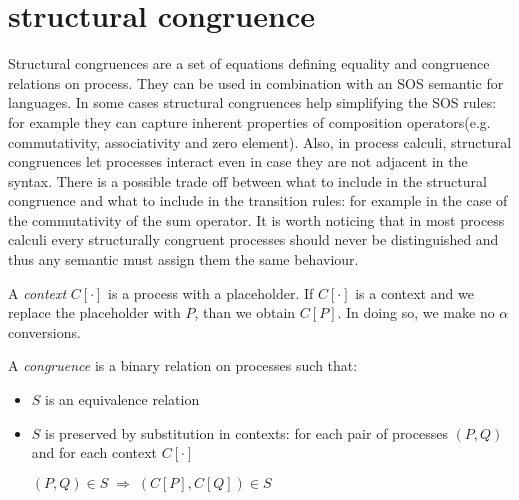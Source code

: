 \section{structural congruence}

Structural congruences are a set of equations defining equality and congruence relations on process. They can be used in combination with an SOS semantic for languages. In some cases structural congruences help simplifying the SOS rules: for example they can capture inherent properties of composition operators(e.g. commutativity, associativity and zero element). Also, in process calculi, structural congruences let processes interact even in case they are not adjacent in the syntax. There is a possible trade off between what to include in the structural congruence and what to include in the transition rules: for example in the case of the commutativity of the sum operator. It is worth noticing that in most process calculi every structurally congruent processes should never be distinguished and thus any semantic must assign them the same behaviour.

\begin{definition}
  A \emph{context} $C[\cdot]$ is a process with a placeholder. If $C[\cdot]$ is a context and we replace the placeholder with $P$, than we obtain $C[P]$. In doing so, we make no $\alpha$ conversions.
\end{definition}


\begin{definition}
  A \emph{congruence} is a binary relation on processes such that:
  \begin{itemize}
    \item 
      $S$ is an equivalence relation
    \item 
      $S$ is preserved by substitution in contexts: for each pair of processes $(P, Q)$ and for each context $C[\cdot]$
      \begin{center}
	$(P,Q)\in S\; \Rightarrow\; (C[P], C[Q])\in S$
      \end{center}
  \end{itemize}
\end{definition}


